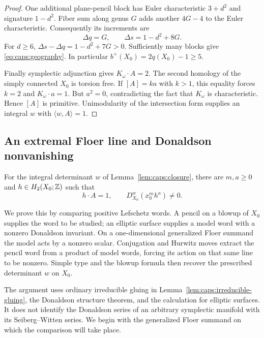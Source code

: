\begin{proof}
One additional plane-pencil block has Euler characteristic $3+d^2$
and signature $1-d^2$.  Fiber sum along genus $G$ adds another $4G-4$
to the Euler characteristic.  Consequently its increments are
\begin{equation}\label{eq:caps:block-increments}
                     \Delta q=G,
 \qquad \Delta s=1-d^2+8G.
\end{equation}
For $d\ge6$, $\Delta s-\Delta q=1-d^2+7G>0$.  Sufficiently many
blocks give \eqref{eq:caps:geography}.  In particular
$b^+(X_0)=2q(X_0)-1\ge5$.

Finally symplectic adjunction gives $K_\omega\cdot A=2$.  The second
homology of the simply connected $X_0$ is torsion free.  If $[A]=ka$
with $k>1$, this equality forces $k=2$ and $K_\omega\cdot a=1$.
But $a^2=0$, contradicting the fact that $K_\omega$ is characteristic.
Hence $[A]$ is primitive.  Unimodularity of the intersection form supplies
an integral $w$ with $\langle w,A\rangle=1$.
\end{proof}

\subsection{An extremal Floer line and Donaldson nonvanishing}

\begin{proposition}\label{prop:caps:nonvanishing}
For the integral determinant $w$ of Lemma~\ref{lem:caps:closure},
there are $m,a\ge0$ and $h\in H_2(X_0;\mathbb Z)$ such that
\begin{equation}\label{eq:caps:initial-invariant}
       h\cdot A=1,
       \qquad D^w_{X_0}(x_0^m h^a)\ne0.
\end{equation}
\end{proposition}

We prove this by comparing positive Lefschetz words.  A pencil on a
blowup of $X_0$ supplies the word to be studied; an elliptic surface
supplies a model word with a nonzero Donaldson invariant.  On a
one-dimensional generalized Floer summand the model acts by a nonzero
scalar.  Conjugation and Hurwitz moves extract the pencil word from a
product of model words, forcing its action on that same line to be
nonzero.  Simple type and the blowup formula then recover the prescribed
determinant $w$ on $X_0$.

The argument uses ordinary irreducible gluing in
Lemma~\ref{lem:caps:irreducible-gluing}, the Donaldson structure theorem,
and the calculation for elliptic surfaces.  It does not identify the
Donaldson series of an arbitrary symplectic manifold with its
Seiberg--Witten series.  We begin with the generalized Floer summand
on which the comparison will take place.


